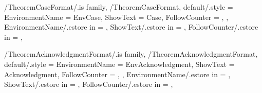 
\pgfkeys
{
  /TheoremCaseFormat/.is family, /TheoremCaseFormat,
  default/.style =
  {
    EnvironmentName = {EnvCase},
    ShowText = {Case},
    FollowCounter = \empty,
  },
  EnvironmentName/.estore in = \GetTheoremCaseFormatEnvironmentName,
  ShowText/.estore in = \GetTheoremCaseFormatShowText,
  FollowCounter/.estore in = \GetTheoremCaseFormatFollowCounter,
} %

\newcommand{\InsertCase}[1]
{%
  \InsertTheoremContent[\empty]{%
    \GetTheoremCaseFormatEnvironmentName}{#1}%
} %

\newcommand{\InitTheoremCaseFormat}
{%
  \theoremstyle{definition}%
  \ifthenelse{\equal{\GetTheoremCaseFormatFollowCounter}{\empty}}%
  {%
    \newtheorem*{%
      \GetTheoremCaseFormatEnvironmentName}{%
      \GetTheoremCaseFormatShowText}
  }%
  {%
    \MappingTheoremCounter[Case]{\GetTheoremCaseFormatFollowCounter}%
    \newtheorem{%
      \GetTheoremCaseFormatEnvironmentName}{%
      \GetTheoremCaseFormatShowText}[%
      \GetTheoremCaseFormatFollowCounter]%
  }%
} %


\pgfkeys
{
  /TheoremAcknowledgmentFormat/.is family, /TheoremAcknowledgmentFormat,
  default/.style =
  {
    EnvironmentName = {EnvAcknowledgment},
    ShowText = {Acknowledgment},
    FollowCounter = \empty,
  },
  EnvironmentName/.estore in = \GetTheoremAcknowledgmentFormatEnvironmentName,
  ShowText/.estore in = \GetTheoremAcknowledgmentFormatShowText,
  FollowCounter/.estore in = \GetTheoremAcknowledgmentFormatFollowCounter,
} %

\newcommand{\InsertAcknowledgment}[1]
{%
  \InsertTheoremContent[\empty]{%
    \GetTheoremAcknowledgmentFormatEnvironmentName}{#1}%
} %

\newcommand{\InitTheoremAcknowledgmentFormat}
{%
  \theoremstyle{definition}%
  \ifthenelse{\equal{\GetTheoremAcknowledgmentFormatFollowCounter}{\empty}}%
  {%
    \newtheorem*{%
      \GetTheoremAcknowledgmentFormatEnvironmentName}{%
      \GetTheoremAcknowledgmentFormatShowText}
  }%
  {%
    \MappingTheoremCounter[Acknowledgment]{\GetTheoremAcknowledgmentFormatFollowCounter}%
    \newtheorem{%
      \GetTheoremAcknowledgmentFormatEnvironmentName}{%
      \GetTheoremAcknowledgmentFormatShowText}[%
      \GetTheoremAcknowledgmentFormatFollowCounter]%
  }%
} %

